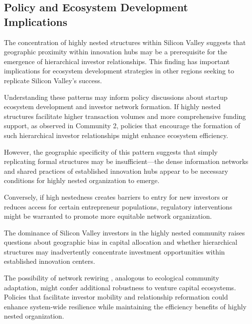 \subsection{Policy and Ecosystem Development Implications}

The concentration of highly nested structures within Silicon Valley suggests that geographic proximity within innovation hubs may be a prerequisite for the emergence of hierarchical investor relationships. This finding has important implications for ecosystem development strategies in other regions seeking to replicate Silicon Valley's success. 

Understanding these patterns may inform policy discussions about startup ecosystem development and investor network formation. If highly nested structures facilitate higher transaction volumes and more comprehensive funding support, as observed in Community 2, policies that encourage the formation of such hierarchical investor relationships might enhance ecosystem efficiency. 

However, the geographic specificity of this pattern suggests that simply replicating formal structures may be insufficient—the dense information networks and shared practices of established innovation hubs appear to be necessary conditions for highly nested organization to emerge.

Conversely, if high nestedness creates barriers to entry for new investors or reduces access for certain entrepreneur populations, regulatory interventions might be warranted to promote more equitable network organization. 

The dominance of Silicon Valley investors in the highly nested community raises questions about geographic bias in capital allocation and whether hierarchical structures may inadvertently concentrate investment opportunities within established innovation centers.

The possibility of network rewiring , analogous to ecological community adaptation, might confer additional robustness to venture capital ecosystems. Policies that facilitate investor mobility and relationship reformation could enhance system-wide resilience while maintaining the efficiency benefits of highly nested organization.


